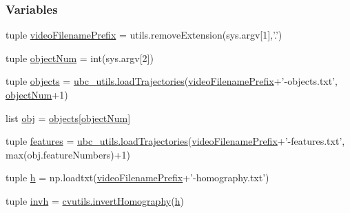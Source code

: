 \subsubsection*{Variables}
\begin{DoxyCompactItemize}
\item 
tuple \hyperlink{namespacetest-compute-object-position-from-features_adc698cf7dcc144504b814a49b1ab2d03}{video\-Filename\-Prefix} = utils.\-remove\-Extension(sys.\-argv\mbox{[}1\mbox{]},'.')
\item 
tuple \hyperlink{namespacetest-compute-object-position-from-features_a3f91c49cda8f4488c79a71428bb71944}{object\-Num} = int(sys.\-argv\mbox{[}2\mbox{]})
\item 
tuple \hyperlink{namespacetest-compute-object-position-from-features_a5541d2d8d35cc1a07f40cf268806cdcd}{objects} = \hyperlink{namespaceubc__utils_a24596344ca92b512a6ba25e79fca2214}{ubc\-\_\-utils.\-load\-Trajectories}(\hyperlink{namespacetest-compute-object-position-from-features_adc698cf7dcc144504b814a49b1ab2d03}{video\-Filename\-Prefix}+'-\/objects.\-txt', \hyperlink{namespacetest-compute-object-position-from-features_a3f91c49cda8f4488c79a71428bb71944}{object\-Num}+1)
\item 
list \hyperlink{namespacetest-compute-object-position-from-features_ae7b665ad8f0a66799e0a33283b39ca61}{obj} = \hyperlink{namespacetest-compute-object-position-from-features_a5541d2d8d35cc1a07f40cf268806cdcd}{objects}\mbox{[}\hyperlink{namespacetest-compute-object-position-from-features_a3f91c49cda8f4488c79a71428bb71944}{object\-Num}\mbox{]}
\item 
tuple \hyperlink{namespacetest-compute-object-position-from-features_ae8615fa1af68357d5dbde0a7aa24dc80}{features} = \hyperlink{namespaceubc__utils_a24596344ca92b512a6ba25e79fca2214}{ubc\-\_\-utils.\-load\-Trajectories}(\hyperlink{namespacetest-compute-object-position-from-features_adc698cf7dcc144504b814a49b1ab2d03}{video\-Filename\-Prefix}+'-\/features.\-txt', max(obj.\-feature\-Numbers)+1)
\item 
tuple \hyperlink{namespacetest-compute-object-position-from-features_aa814e45c0ebdd0c97a3015ed28c7f157}{h} = np.\-loadtxt(\hyperlink{namespacetest-compute-object-position-from-features_adc698cf7dcc144504b814a49b1ab2d03}{video\-Filename\-Prefix}+'-\/homography.\-txt')
\item 
tuple \hyperlink{namespacetest-compute-object-position-from-features_a91e8c535f131b475fb00ee81e203a1a5}{invh} = \hyperlink{namespacecvutils_a0c2c4574d510683c40ddb323f588e10d}{cvutils.\-invert\-Homography}(\hyperlink{namespacetest-compute-object-position-from-features_aa814e45c0ebdd0c97a3015ed28c7f157}{h})

\end{DoxyCompactItemize}
